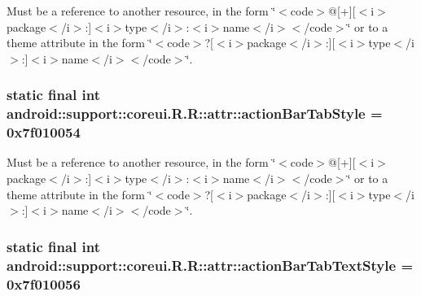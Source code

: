 Must be a reference to another resource, in the form \char`\"{}$<$code$>$@\mbox{[}+\mbox{]}\mbox{[}$<$i$>$package$<$/i$>$:\mbox{]}$<$i$>$type$<$/i$>$:$<$i$>$name$<$/i$>$$<$/code$>$\char`\"{} or to a theme attribute in the form \char`\"{}$<$code$>$?\mbox{[}$<$i$>$package$<$/i$>$:\mbox{]}\mbox{[}$<$i$>$type$<$/i$>$:\mbox{]}$<$i$>$name$<$/i$>$$<$/code$>$\char`\"{}. \hypertarget{classandroid_1_1support_1_1coreui_1_1_r_1_1attr_76d4d6f08db415fc233d30ab903bc537}{
\subsubsection[{actionBarTabStyle}]{\setlength{\rightskip}{0pt plus 5cm}static final int android::support::coreui.R.R::attr::actionBarTabStyle = 0x7f010054}}
\label{classandroid_1_1support_1_1coreui_1_1_r_1_1attr_76d4d6f08db415fc233d30ab903bc537}


Must be a reference to another resource, in the form \char`\"{}$<$code$>$@\mbox{[}+\mbox{]}\mbox{[}$<$i$>$package$<$/i$>$:\mbox{]}$<$i$>$type$<$/i$>$:$<$i$>$name$<$/i$>$$<$/code$>$\char`\"{} or to a theme attribute in the form \char`\"{}$<$code$>$?\mbox{[}$<$i$>$package$<$/i$>$:\mbox{]}\mbox{[}$<$i$>$type$<$/i$>$:\mbox{]}$<$i$>$name$<$/i$>$$<$/code$>$\char`\"{}. \hypertarget{classandroid_1_1support_1_1coreui_1_1_r_1_1attr_039e98701473279110162371d6937ede}{
\subsubsection[{actionBarTabTextStyle}]{\setlength{\rightskip}{0pt plus 5cm}static final int android::support::coreui.R.R::attr::actionBarTabTextStyle = 0x7f010056}}
\label{classandroid_1_1support_1_1coreui_1_1_r_1_1attr_039e98701473279110162371d6937ede}


